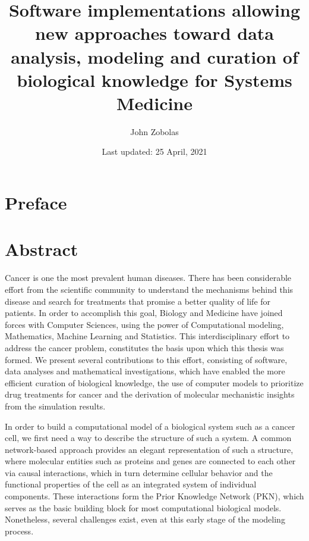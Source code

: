 \documentclass[
  12pt,
]{book}
\title{Software implementations allowing new approaches toward data analysis, modeling and curation of biological knowledge for Systems Medicine}
\author{John Zobolas}
\date{Last updated: 25 April, 2021}
\begin{document}
\maketitle

{
\hypersetup{linkcolor=}
\setcounter{tocdepth}{1}
\tableofcontents
}
\hypertarget{preface}{%
\chapter*{Preface}\label{preface}}

\hypertarget{abstract}{%
\chapter*{Abstract}\label{abstract}}

Cancer is one the most prevalent human diseases.
There has been considerable effort from the scientific community to understand the mechanisms behind this disease and search for treatments that promise a better quality of life for patients.
In order to accomplish this goal, Biology and Medicine have joined forces with Computer Sciences, using the power of Computational modeling, Mathematics, Machine Learning and Statistics.
This interdisciplinary effort to address the cancer problem, constitutes the basis upon which this thesis was formed.
We present several contributions to this effort, consisting of software, data analyses and mathematical investigations, which have enabled the more efficient curation of biological knowledge, the use of computer models to prioritize drug treatments for cancer and the derivation of molecular mechanistic insights from the simulation results.

In order to build a computational model of a biological system such as a cancer cell, we first need a way to describe the structure of such a system. A common network-based approach provides an elegant representation of such a structure, where molecular entities such as proteins and genes are connected to each other via causal interactions, which in turn determine cellular behavior and the functional properties of the cell as an integrated system of individual components. These interactions form the Prior Knowledge Network (PKN), which serves as the basic building block for most computational biological models. Nonetheless, several challenges exist, even at this early stage of the modeling process.
\end{document}
